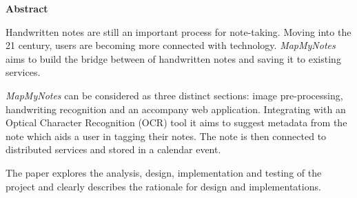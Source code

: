 \thispagestyle{empty}

\begin{center}
    {\LARGE\bf Abstract}
\end{center}


Handwritten notes are still an important process for note-taking. Moving into the 21 century, users are becoming more connected with technology. \textit{MapMyNotes} aims to build the bridge between of handwritten notes and saving it to existing services.

\textit{MapMyNotes} can be considered as three distinct sections: image pre-processing, handwriting recognition and an accompany web application. Integrating with an Optical Character Recognition (OCR) tool it aims to suggest metadata from the note which aids a user in tagging their notes. The note is then connected to distributed services and stored in a calendar event.

The paper explores the analysis, design, implementation and testing of the project and clearly describes the rationale for design and implementations. 
